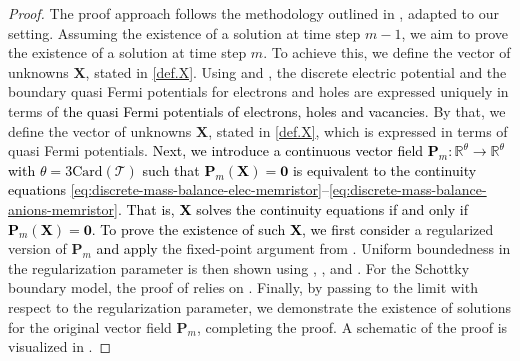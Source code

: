 \documentclass[10pt,a4paper, final]{article}
\newcommand{\reviewerOne}[1]{\textcolor{black}{#1}}
\theoremstyle{definition}								%
\numberwithin{equation}{section}
\numberwithin{figure}{section}
\numberwithin{theorem}{section}
\begin{document}
\begin{proof}
    The proof approach follows the methodology outlined in \cite[Theorem 5.5]{Abdel2023Existence}, adapted to our setting.
    Assuming the existence of a solution at time step $m-1$, we aim to prove the existence of a solution at time step $m$.
    To achieve this, we define the vector of unknowns $\mathbf{X}$, stated in \eqref{def.X}.
    Using  and , the discrete electric potential and the boundary quasi Fermi potentials for electrons and holes are expressed uniquely in terms of \reviewerOne{the quasi Fermi potentials of electrons, holes and vacancies}.
    By that, we define the vector of unknowns $\mathbf{X}$, stated in \eqref{def.X}, which is expressed in terms of quasi Fermi potentials.
    \reviewerOne{
        Next, we introduce a continuous vector field $\mathbf{P}_m : \mathbb{R}^{\theta} \to \mathbb{R}^{\theta}$ with $\theta = 3\textrm{Card}(\mathcal{T})$ such that  $\mathbf{P}_m (\mathbf{X})=\mathbf{0}$ is equivalent to the continuity equations \eqref{eq:discrete-mass-balance-elec-memristor}--\eqref{eq:discrete-mass-balance-anions-memristor}.
        That is, $\mathbf{X}$ solves the continuity equations if and only if $\mathbf{P}_m(\mathbf{X}) = \mathbf{0}$.
    }
    \reviewerOne{To prove the existence of such $\mathbf{X}$, we first consider} a regularized version of $\mathbf{P}_m$ \reviewerOne{and apply} the fixed-point argument from .
    Uniform boundedness in the regularization parameter is then shown using , , and .
    For the Schottky boundary model, the proof of  relies on .
    Finally, by passing to the limit with respect to the regularization parameter, we demonstrate the existence of solutions for the original vector field $\mathbf{P}_m$, completing the proof.
    A schematic of the proof is visualized in .
\end{proof}
\end{document}
